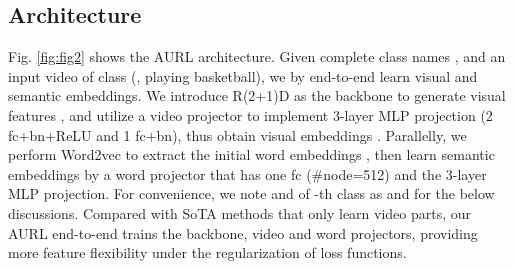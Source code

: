 \documentclass[10pt,twocolumn,letterpaper]{article}
\newlength\figsep\setlength{\figsep}{-2.8ex}
\begin{document}
\subsection{Architecture}
Fig. \ref{fig:fig2} shows the AURL architecture.
Given complete  class names , and an input video  of class  (\eg, playing basketball), we by end-to-end learn visual and semantic embeddings.
We introduce R(2+1)D \cite{tran2018closer} as the backbone to generate visual features , and utilize a video projector  to implement 3-layer MLP projection (2 fc+bn+ReLU and 1 fc+bn), thus obtain visual embeddings .
Parallelly, we perform Word2vec  \cite{mikolov2013efficient} to extract the initial word embeddings , then learn semantic embeddings  by a word projector  that has one fc (\#node=512) and the 3-layer MLP projection. 
For convenience, we note  and  of -th class as  and  for the below discussions.
Compared with SoTA methods \cite{brattoli2020rethinking,qiu2021boosting} that only learn video parts, our AURL end-to-end trains the backbone, video and word projectors, providing more feature flexibility under the regularization of loss functions.  


\begin{comment}


\begin{figure*}
    \centering
    \begin{minipage}{0.4\textwidth}
        \centering
        \texttt{[image: mixup]}
        \caption{Illustration of {\em mixup transformation}. We obtain unseen classes \protect\scalebox{1}{\color{red}{\textbullet}} by linearly combining all seen classes \protect\scalebox{0.75}{};  means classes appearing in test.}
        \label{fig:mixup}
        \vspace{\figsep}
    \end{minipage}\hspace{8pt}
    \begin{minipage}{0.55\textwidth}
        \centering
        \texttt{[image: alpha]}
        \caption{Illustration of {\em mixup transformation}. We obtain unseen classes \protect\scalebox{1}{\color{red}{\textbullet}} by linearly combining all seen classes \protect\scalebox{0.75}{};  means classes appearing in test}
        \label{fig:fig3}
        \vspace{\figsep}
    \end{minipage}
\end{figure*}

\end{comment}
\end{document}
